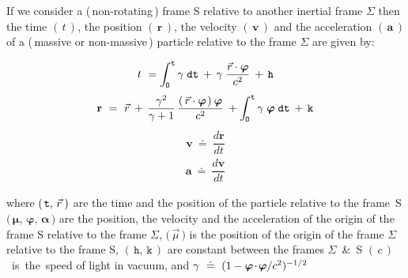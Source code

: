 \documentclass[10pt,fleqn]{article}
\begin{document}
\noindent If we consider a (\,non-rotating\,) frame S relative to another inertial frame $\Sigma$ then the time $( \, {t} \, )$, the position $( \, \mathbf{r} \, )$, the velocity $( \, \mathbf{v} \, )$ and the acceleration $( \, \mathbf{a} \, )$ of a (\,massive or non-massive\,) particle relative to the frame $\Sigma$ are given by:
\par \vspace{+0.36em}
\begin{eqnarray*}
t ~= \int_{\hspace{-0.045em}\mathtt{O}}^{\mathtt{t}} \gamma \; \mathtt{dt} \: + \, \gamma \; \frac{\vec{r} \cdot \boldsymbol{\varphi}}{c^2} \: + \, \mathtt{h}
\end{eqnarray*}
\vspace{+0.15em}
\begin{eqnarray*}
\mathbf{r} ~=~ \vec{r} \: + \, \frac{\gamma^2}{\gamma + 1} \, \frac{( \, \vec{r} \cdot \boldsymbol{\varphi} \hspace{+0.09em}) \: \boldsymbol{\varphi}}{c^2} \: + \int_{\hspace{-0.045em}\mathtt{O}}^{\mathtt{t}} \gamma \; \boldsymbol{\varphi} \; \mathtt{dt} \: + \, \mathtt{k}
\end{eqnarray*}
\vspace{+0.15em}
\begin{eqnarray*}
\mathbf{v} ~\doteq~ \dfrac{d\mathbf{r}}{dt}
\end{eqnarray*}
\vspace{+0.15em}
\begin{eqnarray*}
\mathbf{a} ~\doteq~ \dfrac{d\mathbf{v}}{dt}
\end{eqnarray*}
\par \vspace{+1.80em}
\noindent where $(\hspace{+0.12em}\mathtt{t}, \, \vec{r}\hspace{+0.21em})$ are the time and the position of the particle relative to the \hbox {frame S} $( \, ${\small $\boldsymbol{\mu}$}$, \, ${\small $\boldsymbol{\varphi}$}$, \, ${\small $\boldsymbol{\alpha}$}$ \, )$ are the position, the velocity and the acceleration of the origin of the frame S relative to the frame $\Sigma$, $( \, ${\small $\vec{\mu}$}$ \, )$ is the position of the origin of the frame $\Sigma$ relative to the frame S, $( \, \mathtt{h}, \, \mathtt{k} \, )$ are constant between the frames \hbox {$\Sigma$ {\small \&} S} \hbox {$( \, c \, )$ is the speed} of light in vacuum, and {\small $\gamma ~\doteq~ ({1 - \boldsymbol{\varphi} \hspace{-0.114em}\cdot\hspace{-0.114em} \boldsymbol{\varphi}/c^2})^{-1/2}$}
\end{document}
